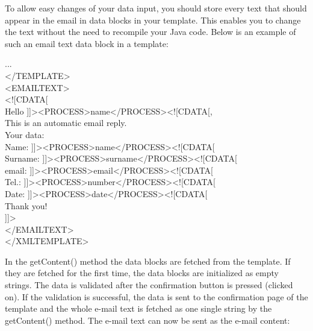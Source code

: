 To allow easy changes of your data input, you should store every text 
that should appear in the email in data blocks in your template. 
This enables you to change the text without the need to recompile your Java
code. 
Below is an example of such an email text data block in a template:

\begin{java}
...\\
</TEMPLATE>\\
<EMAILTEXT>\\
<![CDATA[\\
Hello ]]><PROCESS>name</PROCESS><![CDATA[,\\
This is an automatic email reply.\\
Your data:\\
Name:           ]]><PROCESS>name</PROCESS><![CDATA[\\
Surname:        ]]><PROCESS>surname</PROCESS><![CDATA[\\
email:  ]]><PROCESS>email</PROCESS><![CDATA[\\
Tel.:           ]]><PROCESS>number</PROCESS><![CDATA[\\
Date:           ]]><PROCESS>date</PROCESS><![CDATA[\\
Thank you!\\
]]>\\
</EMAILTEXT>\\
</XMLTEMPLATE>\\
\end{java}

In the {\meth getContent()} method the data blocks are fetched from the template.
If they are fetched for the first time, the data blocks are initialized as empty strings.
The data is validated after the confirmation button is
pressed (clicked on). If the validation is successful, the data is sent
to the confirmation page of the template and the whole e-mail text is
fetched as one single string by the {\meth getContent()} method. 
The e-mail text can now be sent as the e-mail content:

